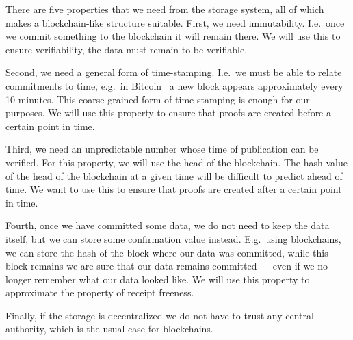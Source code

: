 There are five properties that we need from the storage system, all of which 
makes a blockchain-like structure suitable.
First, we need immutability.
I.e.\ once we commit something to the blockchain it will remain there.
We will use this to ensure verifiability, the data must remain to be verifiable.

Second, we need a general form of time-stamping.
I.e.\ we must be able to relate commitments to time, e.g.\ in 
Bitcoin~\cite{Bitcoin} a new block appears approximately every 10 minutes.
This coarse-grained form of time-stamping is enough for our purposes.
We will use this property to ensure that proofs are created before a certain 
point in time.

Third, we need an unpredictable number whose time of publication can be 
verified.
For this property, we will use the head of the blockchain.
The hash value of the head of the blockchain at a given time will be difficult 
to predict ahead of time.
We want to use this to ensure that proofs are created after a certain point in 
time.

Fourth, once we have committed some data, we do not need to keep the data 
itself, but we can store some confirmation value instead.
E.g.\ using blockchains, we can store the hash of the block where our data was 
committed, while this block remains we are sure that our data remains committed 
--- even if we no longer remember what our data looked like.
We will use this property to approximate the property of receipt freeness.

Finally, if the storage is decentralized we do not have to trust any central 
authority, which is the usual case for blockchains.
